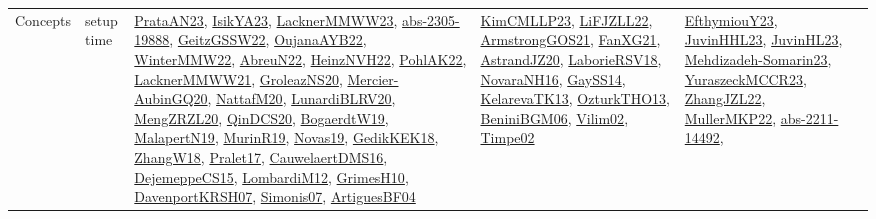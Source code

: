 {\begin{longtable}{llp{6cm}p{6cm}p{6cm}}
Concepts & setup time & \href{articles/PrataAN23.pdf}{PrataAN23}\cite{PrataAN23}, \href{articles/IsikYA23.pdf}{IsikYA23}\cite{IsikYA23}, \href{articles/LacknerMMWW23.pdf}{LacknerMMWW23}\cite{LacknerMMWW23}, \href{articles/abs-2305-19888.pdf}{abs-2305-19888}\cite{abs-2305-19888}, \href{papers/GeitzGSSW22.pdf}{GeitzGSSW22}\cite{GeitzGSSW22}, \href{papers/OujanaAYB22.pdf}{OujanaAYB22}\cite{OujanaAYB22}, \href{papers/WinterMMW22.pdf}{WinterMMW22}\cite{WinterMMW22}, \href{articles/AbreuN22.pdf}{AbreuN22}\cite{AbreuN22}, \href{articles/HeinzNVH22.pdf}{HeinzNVH22}\cite{HeinzNVH22}, \href{articles/PohlAK22.pdf}{PohlAK22}\cite{PohlAK22}, \href{papers/LacknerMMWW21.pdf}{LacknerMMWW21}\cite{LacknerMMWW21}, \href{papers/GroleazNS20.pdf}{GroleazNS20}\cite{GroleazNS20}, \href{papers/Mercier-AubinGQ20.pdf}{Mercier-AubinGQ20}\cite{Mercier-AubinGQ20}, \href{papers/NattafM20.pdf}{NattafM20}\cite{NattafM20}, \href{articles/LunardiBLRV20.pdf}{LunardiBLRV20}\cite{LunardiBLRV20}, \href{articles/MengZRZL20.pdf}{MengZRZL20}\cite{MengZRZL20}, \href{articles/QinDCS20.pdf}{QinDCS20}\cite{QinDCS20}, \href{papers/BogaerdtW19.pdf}{BogaerdtW19}\cite{BogaerdtW19}, \href{papers/MalapertN19.pdf}{MalapertN19}\cite{MalapertN19}, \href{papers/MurinR19.pdf}{MurinR19}\cite{MurinR19}, \href{articles/Novas19.pdf}{Novas19}\cite{Novas19}, \href{articles/GedikKEK18.pdf}{GedikKEK18}\cite{GedikKEK18}, \href{articles/ZhangW18.pdf}{ZhangW18}\cite{ZhangW18}, \href{papers/Pralet17.pdf}{Pralet17}\cite{Pralet17}, \href{papers/CauwelaertDMS16.pdf}{CauwelaertDMS16}\cite{CauwelaertDMS16}, \href{papers/DejemeppeCS15.pdf}{DejemeppeCS15}\cite{DejemeppeCS15}, \href{articles/LombardiM12.pdf}{LombardiM12}\cite{LombardiM12}, \href{papers/GrimesH10.pdf}{GrimesH10}\cite{GrimesH10}, \href{papers/DavenportKRSH07.pdf}{DavenportKRSH07}\cite{DavenportKRSH07}, \href{articles/Simonis07.pdf}{Simonis07}\cite{Simonis07}, \href{papers/ArtiguesBF04.pdf}{ArtiguesBF04}\cite{ArtiguesBF04} & \href{papers/KimCMLLP23.pdf}{KimCMLLP23}\cite{KimCMLLP23}, \href{papers/LiFJZLL22.pdf}{LiFJZLL22}\cite{LiFJZLL22}, \href{papers/ArmstrongGOS21.pdf}{ArmstrongGOS21}\cite{ArmstrongGOS21}, \href{articles/FanXG21.pdf}{FanXG21}\cite{FanXG21}, \href{articles/AstrandJZ20.pdf}{AstrandJZ20}\cite{AstrandJZ20}, \href{articles/LaborieRSV18.pdf}{LaborieRSV18}\cite{LaborieRSV18}, \href{articles/NovaraNH16.pdf}{NovaraNH16}\cite{NovaraNH16}, \href{papers/GaySS14.pdf}{GaySS14}\cite{GaySS14}, \href{papers/KelarevaTK13.pdf}{KelarevaTK13}\cite{KelarevaTK13}, \href{articles/OzturkTHO13.pdf}{OzturkTHO13}\cite{OzturkTHO13}, \href{papers/BeniniBGM06.pdf}{BeniniBGM06}\cite{BeniniBGM06}, \href{papers/Vilim02.pdf}{Vilim02}\cite{Vilim02}, \href{articles/Timpe02.pdf}{Timpe02}\cite{Timpe02} & \href{papers/EfthymiouY23.pdf}{EfthymiouY23}\cite{EfthymiouY23}, \href{papers/JuvinHHL23.pdf}{JuvinHHL23}\cite{JuvinHHL23}, \href{papers/JuvinHL23.pdf}{JuvinHL23}\cite{JuvinHL23}, \href{papers/Mehdizadeh-Somarin23.pdf}{Mehdizadeh-Somarin23}\cite{Mehdizadeh-Somarin23}, \href{articles/YuraszeckMCCR23.pdf}{YuraszeckMCCR23}\cite{YuraszeckMCCR23}, \href{papers/ZhangJZL22.pdf}{ZhangJZL22}\cite{ZhangJZL22}, \href{articles/MullerMKP22.pdf}{MullerMKP22}\cite{MullerMKP22}, \href{articles/abs-2211-14492.pdf}{abs-2211-14492}\cite{abs-2211-14492}, 
\end{longtable}}

